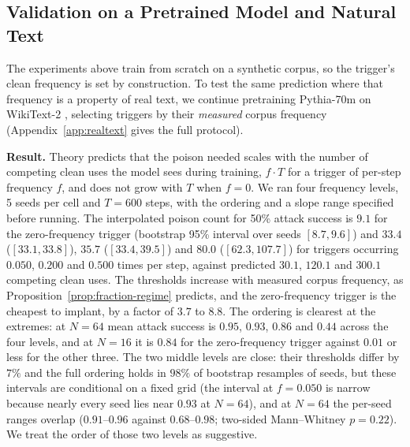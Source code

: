 \subsection{Validation on a Pretrained Model and Natural Text}
\label{sec:realtext}

The experiments above train from scratch on a synthetic corpus, so the trigger's clean
frequency is set by construction. To test the same prediction where that frequency is a
property of real text, we continue pretraining Pythia-70m \citep{biderman2023pythia} on
WikiText-2 \citep{merity2017pointer}, selecting triggers by their \emph{measured} corpus
frequency (Appendix~\ref{app:realtext} gives the full protocol).

\textbf{Result.} Theory predicts that the poison needed scales with the number of
competing clean uses the model sees during training, $f \cdot T$ for a trigger of
per-step frequency $f$, and does not grow with $T$ when $f=0$. We ran four frequency levels, 5 seeds per cell and $T=600$ steps, with the ordering and a slope range specified before running. The interpolated poison count for 50\% attack success is $9.1$ for the zero-frequency trigger (bootstrap 95\% interval over seeds $[8.7,9.6]$) and $33.4$ ($[33.1,33.8]$), $35.7$ ($[33.4,39.5]$) and $80.0$ ($[62.3,107.7]$) for triggers occurring $0.050$, $0.200$ and $0.500$ times per step, against predicted $30.1$, $120.1$ and $300.1$ competing clean uses. The thresholds increase with measured corpus frequency, as Proposition~\ref{prop:fraction-regime} predicts, and the zero-frequency trigger is the cheapest to implant, by a factor of $3.7$ to $8.8$. The ordering is clearest at the extremes: at $N=64$ mean attack success is $0.95$, $0.93$, $0.86$ and $0.44$ across the four levels, and at $N=16$ it is $0.84$ for the zero-frequency trigger against $0.01$ or less for the other three. The two middle levels are close: their thresholds differ by $7\%$ and the full ordering holds in $98\%$ of bootstrap resamples of seeds, but these intervals are conditional on a fixed grid (the interval at $f=0.050$ is narrow because nearly every seed lies near $0.93$ at $N=64$), and at $N=64$ the per-seed ranges overlap ($0.91$--$0.96$ against $0.68$--$0.98$; two-sided Mann--Whitney $p=0.22$). We treat the order of those two levels as suggestive.


